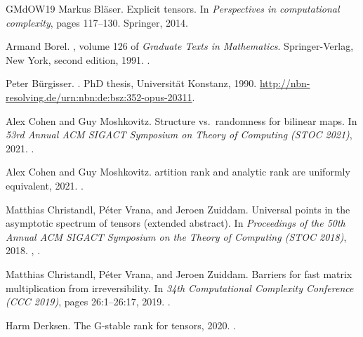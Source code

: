 \documentclass[10pt,a4paper]{article}
\theoremstyle{definition}
\theoremstyle{remark}
\begin{document}
\begin{thebibliography}{GMdOW19}
Markus Bl{\"a}ser.
\newblock Explicit tensors.
\newblock In {\em Perspectives in computational complexity}, pages 117--130.
  Springer, 2014.

Armand Borel.
, volume 126 of {\em Graduate Texts in
  Mathematics}.
\newblock Springer-Verlag, New York, second edition, 1991.
\newblock \href {https://doi.org/10.1007/978-1-4612-0941-6}
  {}.

Peter Bürgisser.
.
\newblock PhD thesis, Universität Konstanz, 1990.
\newblock \url{http://nbn-resolving.de/urn:nbn:de:bsz:352-opus-20311}.

Alex Cohen and Guy Moshkovitz.
\newblock Structure vs.~randomness for bilinear maps.
\newblock In {\em 53rd Annual {ACM} {SIGACT} Symposium on Theory of Computing
  (STOC 2021)}, 2021.
\newblock \href {https://doi.org/10.1145/3406325.3451007}
  {}.

Alex Cohen and Guy Moshkovitz.
artition rank and analytic rank are uniformly
  equivalent, 2021.
\newblock \href {http://arxiv.org/abs/2102.10509} {}.

Matthias Christandl, P{\'e}ter Vrana, and Jeroen Zuiddam.
\newblock Universal points in the asymptotic spectrum of tensors (extended
  abstract).
\newblock In {\em Proceedings of the 50th Annual ACM SIGACT Symposium on the
  Theory of Computing (STOC 2018)}, 2018.
\newblock \href {http://arxiv.org/abs/1709.07851} {},
  \href {https://doi.org/10.1145/ 3188745.3188766} {}.

Matthias Christandl, P{\'{e}}ter Vrana, and Jeroen Zuiddam.
\newblock Barriers for fast matrix multiplication from irreversibility.
\newblock In {\em 34th Computational Complexity Conference ({CCC} 2019)}, pages
  26:1--26:17, 2019.
\newblock \href {https://doi.org/10.4230/LIPIcs.CCC.2019.26}
  {}.

Harm Derksen.
\newblock The {G}-stable rank for tensors, 2020.
\newblock \href {http://arxiv.org/abs/2002.08435} {}.


\end{thebibliography}
\end{document}
